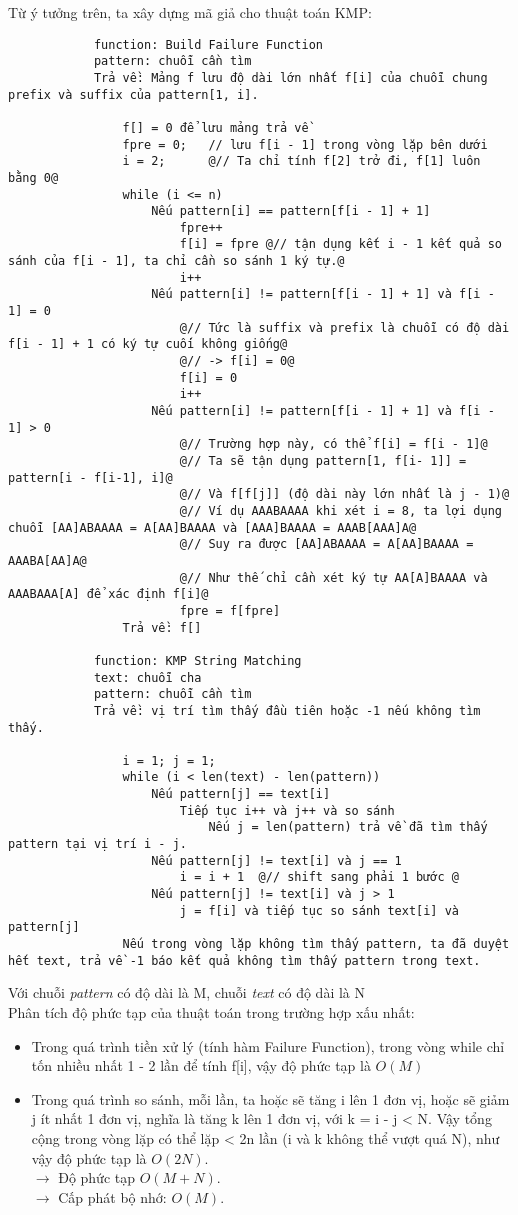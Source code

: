 \documentclass[a4paper,11pt]{article}
\begin{document}
			Từ ý tưởng trên, ta xây dựng mã giả cho thuật toán KMP:

			\begin{lstlisting}
			function: Build Failure Function
			pattern: chuỗi cần tìm 
			Trả về: Mảng f lưu độ dài lớn nhất f[i] của chuỗi chung prefix và suffix của pattern[1, i].

				f[] = 0 để lưu mảng trả về
				fpre = 0;   // lưu f[i - 1] trong vòng lặp bên dưới
				i = 2;		@// Ta chỉ tính f[2] trở đi, f[1] luôn bằng 0@
				while (i <= n)		
					Nếu pattern[i] == pattern[f[i - 1] + 1]
						fpre++
						f[i] = fpre	@// tận dụng kết i - 1 kết quả so sánh của f[i - 1], ta chỉ cần so sánh 1 ký tự.@
						i++
					Nếu pattern[i] != pattern[f[i - 1] + 1] và f[i - 1] = 0
						@// Tức là suffix và prefix là chuỗi có độ dài f[i - 1] + 1 có ký tự cuối không giống@
						@// -> f[i] = 0@
						f[i] = 0
						i++
					Nếu pattern[i] != pattern[f[i - 1] + 1] và f[i - 1] > 0
						@// Trường hợp này, có thể f[i] = f[i - 1]@
						@// Ta sẽ tận dụng pattern[1, f[i- 1]] = pattern[i - f[i-1], i]@
						@// Và f[f[j]] (độ dài này lớn nhất là j - 1)@
						@// Ví dụ AAABAAAA khi xét i = 8, ta lợi dụng chuỗi [AA]ABAAAA = A[AA]BAAAA và [AAA]BAAAA = AAAB[AAA]A@
						@// Suy ra được [AA]ABAAAA = A[AA]BAAAA = AAABA[AA]A@
						@// Như thế chỉ cần xét ký tự AA[A]BAAAA và AAABAAA[A] để xác định f[i]@
						fpre = f[fpre]
				Trả về: f[]

			function: KMP String Matching
			text: chuỗi cha 
			pattern: chuỗi cần tìm 
			Trả về: vị trí tìm thấy đầu tiên hoặc -1 nếu không tìm thấy.

				i = 1; j = 1; 
				while (i < len(text) - len(pattern))
					Nếu pattern[j] == text[i]
						Tiếp tục i++ và j++ và so sánh
							Nếu j = len(pattern) trả về đã tìm thấy pattern tại vị trí i - j.
					Nếu pattern[j] != text[i] và j == 1
						i = i + 1  @// shift sang phải 1 bước @
					Nếu pattern[j] != text[i] và j > 1
						j = f[i] và tiếp tục so sánh text[i] và pattern[j] 
				Nếu trong vòng lặp không tìm thấy pattern, ta đã duyệt hết text, trả về -1 báo kết quả không tìm thấy pattern trong text.
					\end{lstlisting}
			
			Với chuỗi \textit{pattern} có độ dài là M, chuỗi \textit{text} có độ dài là N \\
			Phân tích độ phức tạp của thuật toán trong trường hợp xấu nhất:
			\begin{itemize}
				\item Trong quá trình tiền xử lý (tính hàm Failure Function), trong vòng while chỉ tốn nhiều nhất 1 - 2 lần để tính f[i], vậy độ 
				phức tạp là $O(M)$
				\item Trong quá trình so sánh, mỗi lần, ta hoặc sẽ tăng i lên 1 đơn vị, hoặc sẽ giảm j ít nhất 1 đơn vị, nghĩa là tăng k lên 1 đơn vị, với k = i - j < N.
				Vậy tổng cộng trong vòng lặp có thể lặp < 2n lần (i và k không thể vượt quá N), như vậy độ phức tạp là $O(2N)$.\\
				$\to$ Độ phức tạp $O(M + N)$.\\
				$\to$ Cấp phát bộ nhớ: $O(M)$.
			\end{itemize}
\end{document}
